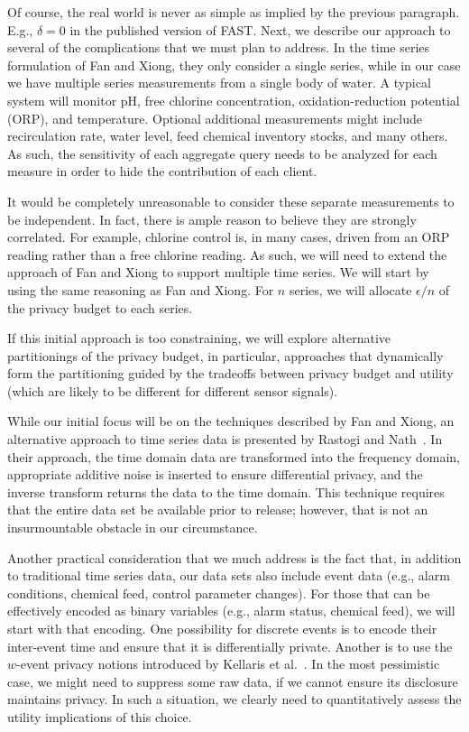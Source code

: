 Of course, the real world is never as simple as implied by the previous
paragraph.  E.g., $\delta= 0$ in the published version of FAST.
Next, we describe our approach to several of the
complications that we must plan to address.
In the time series formulation of Fan and Xiong, they only consider
a single series, while in our case we have multiple series measurements
from a single body of water.  A typical system will monitor pH,
free chlorine concentration, oxidation-reduction potential (ORP),
and temperature.
Optional additional measurements might include recirculation rate, water level,
feed chemical inventory stocks, and many others.
As such,
the sensitivity of each aggregate query needs to be analyzed
for each measure in order to hide the contribution of each client.

It would be completely unreasonable to consider these separate measurements
to be independent.  In fact, there is ample reason to believe they are
strongly correlated.  For example, chlorine control is, in many cases,
driven from an ORP reading rather than a free chlorine reading.
As such, we will need to extend the approach of Fan and Xiong to support
multiple time series.
We will start by using the same reasoning as Fan and Xiong.  For $n$
series, we will allocate $\epsilon / n$ of the privacy budget to each series.

If this initial approach is too constraining, we will explore alternative
partitionings of the privacy budget, in particular, approaches that dynamically
form the partitioning guided by the tradeoffs between privacy budget
and utility (which are likely to be different for different sensor signals).

While our initial focus will be on the techniques described by Fan and Xiong,
an alternative approach to time series data is presented by Rastogi
and Nath~\cite{rn10}.  In their approach, the time domain data are
transformed into the frequency domain, appropriate additive noise
is inserted to ensure differential privacy, and the inverse transform
returns the data to the time domain.
This technique requires that the entire data set be available prior to
release; however, that is not an insurmountable obstacle in our
circumstance.

Another practical consideration that we much address is the fact that, in
addition to traditional time series data, our data sets also include
event data (e.g., alarm conditions, chemical feed, control parameter
changes).  For those that can be effectively encoded as binary variables
(e.g., alarm status, chemical feed), we will start with that encoding.
One possibility for discrete events is to encode their inter-event time
and ensure that it is differentially private.
Another is to use the $w$-event privacy notions introduced by
Kellaris et al.~\cite{Kellaris14}.
In the most pessimistic case, we might need to suppress some raw data,
if we cannot ensure its disclosure maintains privacy.  In such a situation,
we clearly need to quantitatively assess the utility implications
of this choice.

